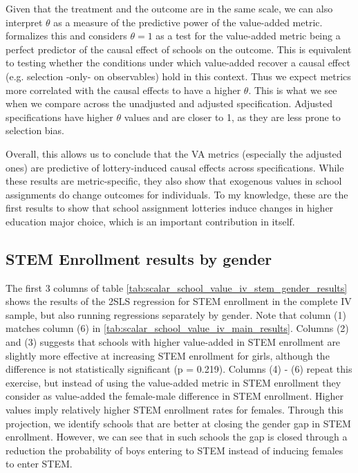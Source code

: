 \documentclass[a4paper, article, english, oneside, unknownkeysallowed, 12pt]{memoir}
\begin{document}
Given that the treatment and the outcome are in the same scale, we can also interpret $\theta$ as a measure of the predictive power of the value-added metric. \textcite{angrist_leveraging_2017} formalizes this and considers $\theta = 1$ as a test for the value-added metric being a perfect predictor of the causal effect of schools on the outcome.
This is equivalent to testing whether the conditions under which value-added recover a causal effect (e.g. selection -only- on observables) hold in this context.
Thus we expect metrics more correlated with the causal effects to have a higher $\theta$. This is what we see when we compare across the unadjusted and adjusted specification. Adjusted specifications have higher $\theta$ values and are closer to 1, as they are less prone to selection bias.


Overall, this allows us to conclude that the VA metrics (especially the adjusted ones) are predictive of lottery-induced causal effects across specifications. 
While these results are metric-specific, they also show that exogenous values in school assignments do change outcomes for individuals. 
To my knowledge, these are the first results to show that school assignment lotteries induce changes in higher education major choice, which is an important contribution in itself.

\subsection{STEM Enrollment results by gender}


The first 3 columns of table \ref{tab:scalar_school_value_iv_stem_gender_results} shows the results of the 2SLS regression for STEM enrollment in the complete IV sample, but also running regressions separately by gender. Note that column (1) matches column (6) in \ref{tab:scalar_school_value_iv_main_results}. 
Columns (2) and (3) suggests that schools with higher value-added in STEM enrollment are slightly more effective at increasing STEM enrollment for girls, although the difference is not statistically significant (p = 0.219). 
Columns (4) - (6) repeat this exercise, but instead of using the value-added metric in STEM enrollment they consider as value-added the female-male difference in STEM enrollment. Higher values imply relatively higher STEM enrollment rates for females. 
Through this projection, we identify schools that are better at closing the gender gap in STEM enrollment. However, we can see that in such schools the gap is closed through a reduction the probability of boys entering to STEM instead of inducing females to enter STEM. 
\end{document}
